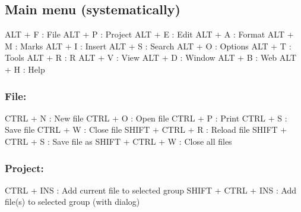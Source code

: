 \newpage
\hypertarget{basic_card_mainmenu}{}
\subsection{Main menu (systematically)}

\vspace{-0.5cm}
\begin{Rtables}[caption={[Main menu keyboard shortcuts]
    Main Menu keyboard shortcuts},
  label=menu:main]
  ALT + F : File
  ALT + P : Project
  ALT + E : Edit
  ALT + A : Format
  ALT + M : Marks
  ALT + I : Insert
  ALT + S : Search
  ALT + O : Options
  ALT + T : Tools
  ALT + R : R
  ALT + V : View
  ALT + D : Window
  ALT + B : Web
  ALT + H : Help
\end{Rtables}


\subsubsection{File:}

\vspace{-0.5cm}
\begin{Rtables}[caption={[File menu keyboard shortcuts]
    File menu keyboard shortcuts},
  label=menu:file]
  CTRL  + N        : New file
  CTRL  + O        : Open file
  CTRL  + P        : Print
  CTRL  + S        : Save file
  CTRL  + W        : Close file
  SHIFT + CTRL + R : Reload file
  SHIFT + CTRL + S : Save file as
  SHIFT + CTRL + W : Close all files
\end{Rtables}


\subsubsection{Project:}

\vspace{-0.5cm}
\begin{Rtables}[caption={[Project menu keyboard shortcuts]
    Project keyboard shortcuts},
  label=menu:project]
  CTRL  + INS        : Add current file to selected group
  SHIFT + CTRL + INS : Add file(s) to selected group (with dialog)
\end{Rtables}


